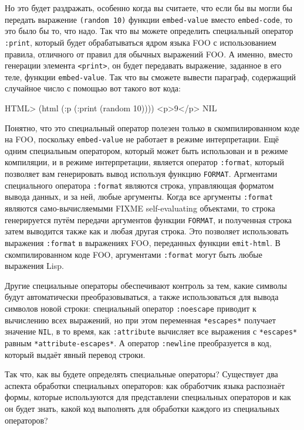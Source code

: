 Но это будет раздражать, особенно когда вы считаете, что если бы вы могли бы передать
выражение \lstinline{(random 10)} функции \lstinline{embed-value} вместо \lstinline{embed-code}, то это
было бы то, что надо.  Так что вы можете определить специальный оператор \lstinline{:print},
который будет обрабатываться ядром языка FOO с использованием правила, отличного от правил
для обычных выражений FOO.  А именно, вместо генерации элемента \lstinline{<print>}, он будет
передавать выражение, заданное в его теле, функции \lstinline{embed-value}.  Так что вы сможете
вывести параграф, содержащий случайное число с помощью вот такого вот кода:

\begin{myverb}
HTML> (html (:p (:print (random 10))))
<p>9</p>
NIL
\end{myverb}

Понятно, что это специальный оператор полезен только в скомпилированном коде на FOO,
поскольку \lstinline{embed-value} не работает в режиме интерпретации.  Ещё одним специальным
оператором, который может быть использован и в режиме компиляции, и в режиме
интерпретации, является оператор \lstinline{:format}, который позволяет вам генерировать вывод
используя функцию \lstinline{FORMAT}.  Аргментами специального оператора \lstinline{:format}
являются строка, управляющая форматом вывода данных, и за ней, любые аргументы.  Когда все
аргументы \lstinline{:format} являются само-вычисляемыми FIXME self-evaluating объектами, то
строка генерируется путём передачи аргументов функции \lstinline{FORMAT}, и полученная строка
затем выводится также как и любая другая строка.  Это позволяет использовать выражения
\lstinline{:format} в выражениях FOO, переданных функции \lstinline{emit-html}.  В скомпилированном
коде FOO, аргументами \lstinline{:format} могут быть любые выражения Lisp.

Другие специальные операторы обеспечивают контроль за тем, какие символы будут
автоматически преобразовываться, а также использоваться для вывода символов новой строки:
специальный оператор \lstinline{:noescape} приводит к вычислению всех выражений, но при этом
переменная \lstinline{*escapes*} получает значение \lstinline{NIL}, в то время, как
\lstinline{:attribute} вычисляет все выражения с \lstinline{*escapes*} равным
\lstinline{*attribute-escapes*}.  А оператор \lstinline{:newline} преобразуется в код, который
выдаёт явный перевод строки.

Так что, как вы будете определять специальные операторы?  Существует два аспекта обработки
специальных операторов: как обработчик языка распознаёт формы, которые используются для
представлени специальных операторов и как он будет знать, какой код выполнять для
обработки каждого из специальных операторов?

